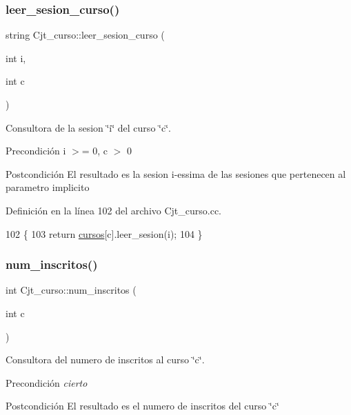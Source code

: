 \subsubsection{\texorpdfstring{leer\+\_\+sesion\+\_\+curso()}{leer\_sesion\_curso()}}
{\footnotesize\ttfamily string Cjt\+\_\+curso\+::leer\+\_\+sesion\+\_\+curso (\begin{DoxyParamCaption}\item[{int}]{i,  }\item[{int}]{c }\end{DoxyParamCaption})}



Consultora de la sesion \char`\"{}i\char`\"{} del curso \char`\"{}c\char`\"{}. 

\begin{DoxyPrecond}{Precondición}
i $>$= 0, c $>$ 0 
\end{DoxyPrecond}
\begin{DoxyPostcond}{Postcondición}
El resultado es la sesion i-\/essima de las sesiones que pertenecen al parametro implicito 
\end{DoxyPostcond}


Definición en la línea 102 del archivo Cjt\+\_\+curso.\+cc.


\begin{DoxyCode}
102                                                 \{
103   \textcolor{keywordflow}{return} \mbox{\hyperlink{class_cjt__curso_af8d4def315cf56b9aab3328bf80bb32c}{cursos}}[c].leer\_sesion(i);
104 \}
\end{DoxyCode}
\mbox{\label{class_cjt__curso_ac160a24d24ca6a57b7e8bf6925b10343}} 
\subsubsection{\texorpdfstring{num\+\_\+inscritos()}{num\_inscritos()}}
{\footnotesize\ttfamily int Cjt\+\_\+curso\+::num\+\_\+inscritos (\begin{DoxyParamCaption}\item[{int}]{c }\end{DoxyParamCaption})}



Consultora del numero de inscritos al curso \char`\"{}c\char`\"{}. 

\begin{DoxyPrecond}{Precondición}
{\itshape cierto} 
\end{DoxyPrecond}
\begin{DoxyPostcond}{Postcondición}
El resultado es el numero de inscritos del curso \char`\"{}c\char`\"{} 
\end{DoxyPostcond}



